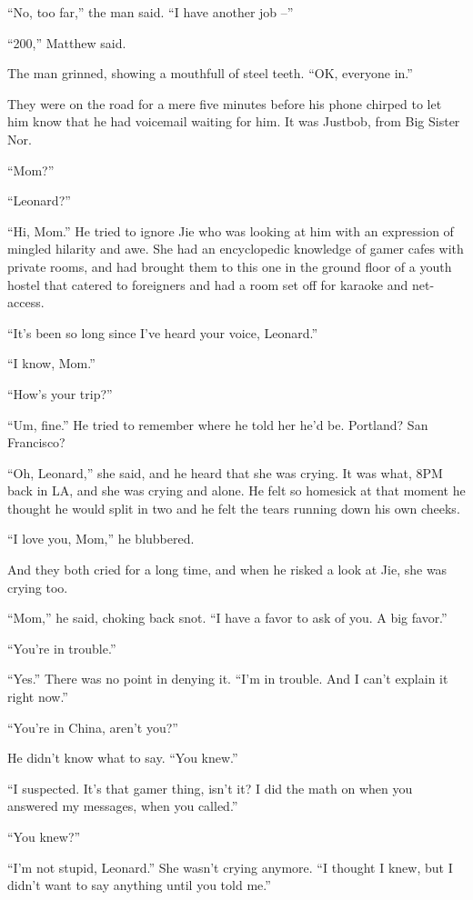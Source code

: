 ``No, too far,'' the man said. ``I have another job --''

``200,'' Matthew said.

The man grinned, showing a mouthfull of steel teeth. ``OK, everyone
in.''

They were on the road for a mere five minutes before his phone
chirped to let him know that he had voicemail waiting for him. It
was Justbob, from Big Sister Nor.

\tb

``Mom?''

``Leonard?''

``Hi, Mom.'' He tried to ignore Jie who was looking at him with an
expression of mingled hilarity and awe. She had an encyclopedic
knowledge of gamer cafes with private rooms, and had brought them
to this one in the ground floor of a youth hostel that catered to
foreigners and had a room set off for karaoke and net-access.

``It's been so long since I've heard your voice, Leonard.''

``I know, Mom.''

``How's your trip?''

``Um, fine.'' He tried to remember where he told her he'd be.
Portland? San Francisco?

``Oh, Leonard,'' she said, and he heard that she was crying. It was
what, 8PM back in LA, and she was crying and alone. He felt so
homesick at that moment he thought he would split in two and he
felt the tears running down his own cheeks.

``I love you, Mom,'' he blubbered.

And they both cried for a long time, and when he risked a look at
Jie, she was crying too.

``Mom,'' he said, choking back snot. ``I have a favor to ask of you. A
big favor.''

``You're in trouble.''

``Yes.'' There was no point in denying it. ``I'm in trouble. And I
can't explain it right now.''

``You're in China, aren't you?''

He didn't know what to say. ``You knew.''

``I suspected. It's that gamer thing, isn't it? I did the math on
when you answered my messages, when you called.''

``You knew?''

``I'm not stupid, Leonard.'' She wasn't crying anymore. ``I thought I
knew, but I didn't want to say anything until you told me.''

